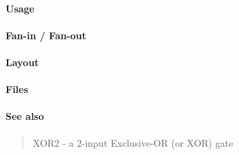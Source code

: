 \paragraph{Usage}

\paragraph{Fan-in / Fan-out}

\paragraph{Layout}

\paragraph{Files}

\paragraph{See also}
\begin{quote}
    XOR2 - a 2-input Exclusive-OR (or XOR) gate
\end{quote}
